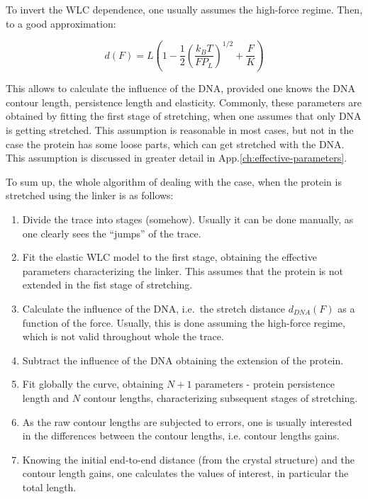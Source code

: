 To invert the WLC dependence, one usually assumes the high-force regime.
Then, to a good approximation:

\begin{equation}
    d(F)=L\left(1-{\frac {1}{2}}\left({\frac {k_{B}T}{FP_L}}\right)^{1/2}+{\frac {F}{K}}\right)
    \label{eq:theory-analysis-invert}
\end{equation}

This allows to calculate the influence of the DNA, provided one knows the DNA contour length, persistence length and elasticity.
Commonly, these parameters are obtained by fitting the first stage of stretching, when one assumes that only DNA is getting stretched.
This assumption is reasonable in most cases, but not in the case the protein has some loose parts, which can get stretched with the DNA\@.
This assumption is discussed in greater detail in App.\ref{ch:effective-parameters}.

To sum up, the whole algorithm of dealing with the case, when the protein is stretched using the linker is as follows:
\begin{enumerate}
    \item Divide the trace into stages (somehow). Usually it can be done manually, as one clearly sees the ``jumps'' of the trace.
    \item Fit the elastic WLC model to the first stage, obtaining the effective parameters characterizing the linker. This assumes that the protein is not extended in the fist stage of stretching.
    \item Calculate the influence of the DNA, i.e.\ the stretch distance $d_{DNA}(F)$ as a function of the force. Usually, this is done assuming the high-force regime, which is not valid throughout whole the trace.
    \item Subtract the influence of the DNA obtaining the extension of the protein.
    \item Fit globally the curve, obtaining $N+1$ parameters - protein persistence length and $N$ contour lengths, characterizing subsequent stages of stretching.
    \item As the raw contour lengths are subjected to errors, one is usually interested in the differences between the contour lengths, i.e. contour lengths gains.
    \item Knowing the initial end-to-end distance (from the crystal structure) and the contour length gains, one calculates the values of interest, in particular the total length.
\end{enumerate}

